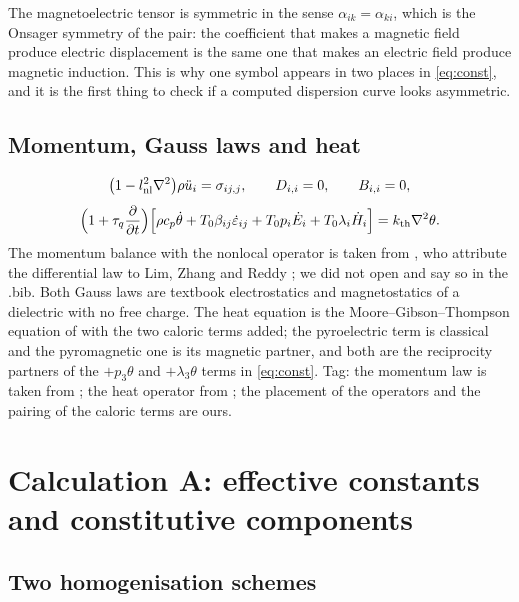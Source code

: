 \documentclass[11pt,a4paper]{article}
\newcommand{\eps}{\varepsilon}
\newcommand{\kB}{k_{\mathrm{th}}}
\newcommand{\aME}{\alpha}
\begin{document}
The magnetoelectric tensor is symmetric in the sense $\aME_{ik}=\aME_{ki}$, which is the Onsager symmetry of
the pair: the coefficient that makes a magnetic field produce electric displacement is the same one that
makes an electric field produce magnetic induction. This is why one symbol appears in two places in
\eqref{eq:const}, and it is the first thing to check if a computed dispersion curve looks asymmetric.

\subsection{Momentum, Gauss laws and heat}

\begin{equation}\label{eq:gov}
\bigl(1-l_{\rm nl}^2\nabla^2\bigr)\rho\ddot u_i=\sigma_{ij,j},\qquad
D_{i,i}=0,\qquad B_{i,i}=0,
\end{equation}
\begin{equation}\label{eq:heat}
\Bigl(1+\tau_q\frac{\partial}{\partial t}\Bigr)
\Bigl[\rho c_p\dot\theta+T_0\beta_{ij}\dot\eps_{ij}+T_0p_i\dot E_i+T_0\lambda_i\dot H_i\Bigr]
=\kB\nabla^2\theta .
\end{equation}
The momentum balance with the nonlocal operator is taken from \cite[Eqs.~(18)--(19)]{Barretta2018}, who
attribute the differential law to Lim, Zhang and Reddy \cite{Lim2015}; we did not open \cite{Lim2015} and say
so in the .bib. Both Gauss laws are textbook electrostatics and magnetostatics of a dielectric with no
free charge. The heat equation is the Moore--Gibson--Thompson equation of
\cite[Eqs.~(2.5) and (3.1)--(3.5)]{Quintanilla2019} with the two caloric terms added; the pyroelectric term is
classical and the pyromagnetic one is its magnetic partner, and both are the reciprocity partners of the
$+p_3\theta$ and $+\lambda_3\theta$ terms in \eqref{eq:const}.
Tag: the momentum law is taken from \cite{Barretta2018}; the heat operator from \cite{Quintanilla2019}; the
placement of the operators and the pairing of the caloric terms are ours.

\section{Calculation A: effective constants and constitutive components}\label{sec:A}

\subsection{Two homogenisation schemes}
\end{document}
